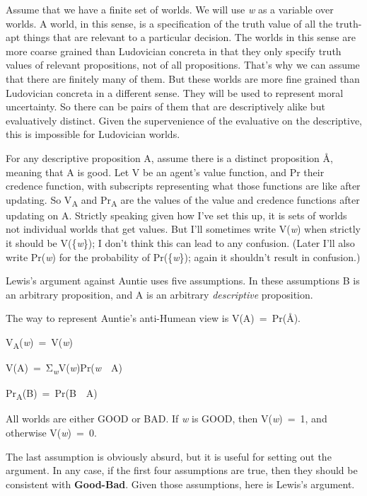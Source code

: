 \documentclass[
  10pt,
  letterpaper,
  DIV=11,
  numbers=noendperiod,
  twoside]{scrartcl}
\providecommand{\tightlist}{%
  \setlength{\itemsep}{0pt}\setlength{\parskip}{0pt}}\usepackage{longtable,booktabs,array}
\begin{document}
Assume that we have a finite set of worlds. We will use \emph{w} as a
variable over worlds. A world, in this sense, is a specification of the
truth value of all the truth-apt things that are relevant to a
particular decision. The worlds in this sense are more coarse grained
than Ludovician concreta in that they only specify truth values of
relevant propositions, not of all propositions. That's why we can assume
that there are finitely many of them. But these worlds are more fine
grained than Ludovician concreta in a different sense. They will be used
to represent moral uncertainty. So there can be pairs of them that are
descriptively alike but evaluatively distinct. Given the supervenience
of the evaluative on the descriptive, this is impossible for Ludovician
worlds.

For any descriptive proposition A, assume there is a distinct
proposition Å, meaning that A is good. Let V be an agent's value
function, and Pr their credence function, with subscripts representing
what those functions are like after updating. So V\textsubscript{A} and
Pr\textsubscript{A} are the values of the value and credence functions
after updating on A. Strictly speaking given how I've set this up, it is
sets of worlds not individual worlds that get values. But I'll sometimes
write V(\emph{w}) when strictly it should be V(\{\emph{w}\}); I don't
think this can lead to any confusion. (Later I'll also write
Pr(\emph{w}) for the probability of Pr(\{\emph{w}\}); again it shouldn't
result in confusion.)

Lewis's argument against Auntie uses five assumptions. In these
assumptions B is an arbitrary proposition, and A is an arbitrary
\emph{descriptive} proposition.

\begin{description}
\tightlist
\item[Equation]
The way to represent Auntie's anti-Humean view is V(A)~=~Pr(Å).
\item[Invariance]
V\textsubscript{A}(\emph{w})~=~V(\emph{w})
\item[Additivity]
V(A)~=~Σ\textsubscript{\emph{w}}V(\emph{w})Pr(\emph{w}~\textbar~A)
\item[Restricted Conditionalisation]
Pr\textsubscript{A}(B)~=~Pr(B~\textbar~A)
\item[Good-Bad]
All worlds are either GOOD or BAD. If \emph{w} is GOOD, then
V(\emph{w})~=~1, and otherwise V(\emph{w})~=~0.
\end{description}

The last assumption is obviously absurd, but it is useful for setting
out the argument. In any case, if the first four assumptions are true,
then they should be consistent with \textbf{Good-Bad}. Given those
assumptions, here is Lewis's argument.
\end{document}
